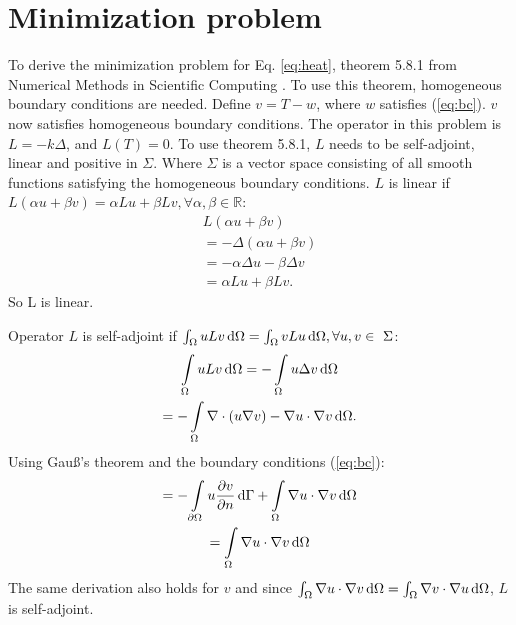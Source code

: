 \section{Minimization problem}
To derive the minimization problem for Eq. \ref{eq:heat}, theorem 5.8.1 from Numerical Methods in Scientific Computing \cite{kan}. To use this theorem, homogeneous boundary conditions are needed. Define $v=T-w$, where $w$ satisfies (\ref{eq:bc}). $v$ now satisfies homogeneous boundary conditions. The operator in this problem is $L=-k\Delta$, and $L(T)=0$. To use theorem 5.8.1, $L$ needs to be self-adjoint, linear and positive in $\Sigma$. Where $\Sigma$ is a vector space consisting of all smooth functions satisfying the homogeneous boundary conditions. $L$ is linear if $L(\alpha u+\beta v)=\alpha Lu+\beta Lv, \forall\alpha,\beta\in\mathbb{R}$:
\begin{gather*}
    L(\alpha u+\beta v)\\
    =-\Delta(\alpha u + \beta v)\\
    =-\alpha\Delta u-\beta \Delta v\\
    = \alpha Lu+\beta Lv.
\end{gather*}So L is linear.

Operator $L$ is self-adjoint if $\int\displaylimits_\Omega uLv \,\mathrm{d}\Omega=\int\displaylimits_\Omega vLu \,\mathrm{d}\Omega, \forall u,v\in~\Sigma$:
\begin{gather*}
    \int\displaylimits_\Omega uLv \,\mathrm{d}\Omega = -\int\displaylimits_\Omega u\Delta v \,\mathrm{d}\Omega\\
    =-\int\displaylimits_\Omega \nabla \cdot (u\nabla v) - \nabla u\cdot\nabla v \,\mathrm{d}\Omega.
\end{gather*}
Using Gau\ss's theorem and the boundary conditions (\ref{eq:bc}):
\begin{gather*}
    =-\int\displaylimits_{\partial\Omega} u\frac{\partial v}{\partial n} \,\mathrm{d}\Gamma + \int\displaylimits_\Omega \nabla u\cdot\nabla v \,\mathrm{d}\Omega\\
    =\int\displaylimits_\Omega \nabla u\cdot \nabla v\,\mathrm{d}\Omega
\end{gather*}
The same derivation also holds for $v$ and since $\int\displaylimits_\Omega \nabla u\cdot \nabla v \,\mathrm{d}\Omega = \int\displaylimits_\Omega \nabla v\cdot \nabla u \,\mathrm{d}\Omega$, $L$ is self-adjoint.


